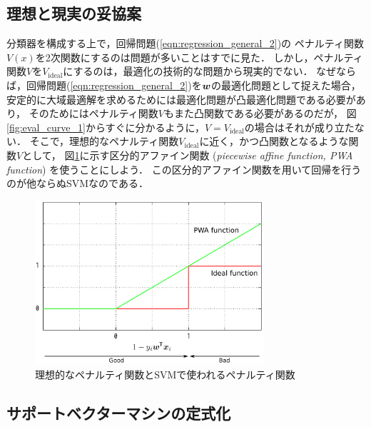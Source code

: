 \subsection{理想と現実の妥協案}

分類器を構成する上で，回帰問題(\ref{eqn:regression_general_2})の
ペナルティ関数$V(x)$を2次関数にするのは問題が多いことはすでに見た．
しかし，ペナルティ関数$V$を$V_{\text{ideal}}$にするのは，最適化の技術的な問題から現実的でない．
なぜならば，回帰問題(\ref{eqn:regression_general_2})を$\boldsymbol{w}$の最適化問題として捉えた場合，
安定的に大域最適解を求めるためには最適化問題が凸最適化問題である必要があり，
そのためにはペナルティ関数$V$もまた凸関数である必要があるのだが，
図\ref{fig:eval_curve_1}からすぐに分かるように，$V = V_{\text{ideal}}$の場合はそれが成り立たない．
そこで，理想的なペナルティ関数$V_{\text{ideal}}$に近く，かつ凸関数となるような関数$V$として，
図\ref{fig:eval_curve_2}に示す区分的アファイン関数 (\textit{piecewise affine function, PWA function}) を使うことにしよう．
この区分的アファイン関数を用いて回帰を行うのが他ならぬSVMなのである．
\begin{figure}[t]
\centerline{\includegraphics[clip,width=240pt]{figures/eval_curve_2.pdf}}
\caption{理想的なペナルティ関数とSVMで使われるペナルティ関数}
\label{fig:eval_curve_2}
\end{figure}


\subsection{サポートベクターマシンの定式化}

